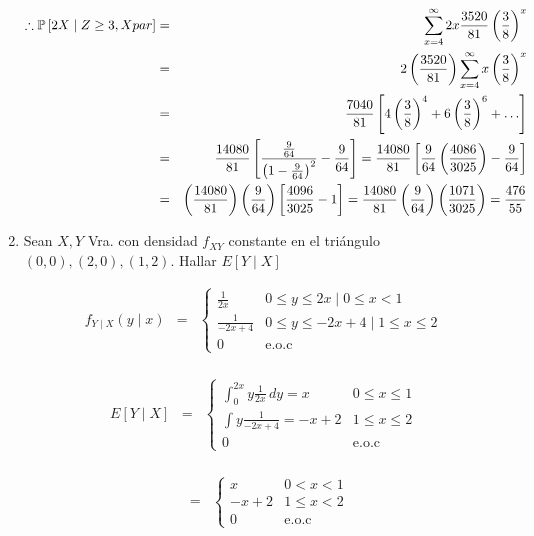 \begin{enumerate}
\begin{eqnarray*}
 \therefore \mathbb{P} \left[2X \mid Z \geq 3, X par \right] &=& \sum _{x=4}^{\infty} 2x \frac{3520}{81} \left( \frac{3}{8} \right)^{x}\\
 &=& 2 \left( \frac{3520}{81} \right) \sum _{x=4} ^{\infty} x \left( \frac{3}{8} \right)^{x}\\
 &=& \frac{7040}{81} \left[4 \left( \frac{3}{8} \right)^4 + 6 \left(\frac{3}{8} \right)^6 + \ldots \right]\\
 &=& \frac{14080}{81}\left[ \frac{\frac{9}{64}}{\left(1 - \frac{9}{64} \right)^2} - \frac{9}{64} \right] = \frac{14080}{81} \left[ \frac{9}{64} \left(\frac{4086}{3025} \right)- \frac{9}{64} \right]\\
&=& \left( \frac{14080}{81} \right) \left(\frac{9}{64} \right) \left[\frac{4096}{3025} - 1\right] = \frac{14080}{81} \left(\frac{9}{64} \right)\left( \frac{1071}{3025} \right)= \frac{476}{55}
\end{eqnarray*}




\item
Sean $X,Y$ Vra. con densidad $f_{XY}$ constante en el tri\'angulo $\left(0,0 \right), \left(2,0 \right), \left(1,2 \right)$. Hallar $E \left[ Y \mid X \right]$

\begin{eqnarray*}
f_{Y \mid X} \left( y \mid x \right) &=& \begin{cases}
\frac{1}{2x}  & 0 \leq y \leq 2x \mid 0\leq x < 1 \\
\frac{1}{-2x+4} & 0 \leq y \leq -2x+4  \mid  1\leq x \leq 2\\
0 &  \textrm{e.o.c} 
\end{cases}\\
\end{eqnarray*}

\begin{eqnarray*}
E \left[Y \mid X \right] &=& \begin{cases}
\int_{0}^{2x} y \frac{1}{2x} \,dy= x  & 0\leq x \leq 1\\
\int y \frac{1}{-2x+4}=-x+2 & 1 \leq x \leq 2\\
0 &  \textrm{e.o.c} 
\end{cases}\\
\end{eqnarray*}

\begin{eqnarray*}
 &=& \begin{cases}
x & 0 <x < 1\\
-x+2 & 1 \leq x < 2\\
0 &  \textrm{e.o.c} 
\end{cases}\\
\end{eqnarray*}
\end{enumerate}
